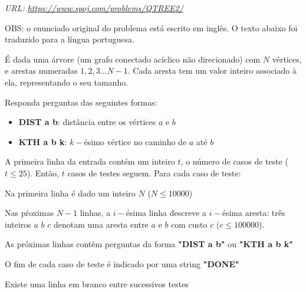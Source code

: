 {

\textit{URL: \url{https://www.spoj.com/problems/QTREE2/}}

\vspace{0.3cm}OBS: o enunciado original do problema está escrito em inglês. O texto abaixo foi traduzido para a língua portuguesa.\vspace{0.3cm}

\begin{mdframed}[backgroundcolor=blue!5]
\vspace{-0.5cm}

\vspace{0.2cm}

É dada uma árvore (um grafo conectado acíclico não direcionado) com $N$ vértices, e arestas numeradas $1, 2, 3...N-1$. Cada aresta tem um valor inteiro associado à ela, representando o seu tamanho.

Responda perguntas das seguintes formas:

\begin{itemize}
    \item \textbf{DIST a b}: distância entre os vértices $a$ e $b$
    \item \textbf{KTH a b k}: $k-$ésimo vértice no caminho de $a$ até $b$
\end{itemize}

\vspace{0.2cm}

A primeira linha da entrada contém um inteiro $t$, o número de casos de teste ($t \leq 25$). Então, $t$ casos de testes seguem. Para cada caso de teste: \vspace{0.1cm}

Na primeira linha é dado um inteiro $N$ ($N \leq 10000$)

Nas pŕoximas $N-1$ linhas, a $i-$ésima linha descreve a $i-$ésima aresta: três inteiros $a$ $b$ $c$ denotam uma aresta entre $a$ e $b$ com custo $c$ ($c \leq 100000$).

As próximas linhas contêm perguntas da forma \textbf{"DIST a b"} ou \textbf{"KTH a b k"}

O fim de cada caso de teste é indicado por uma string \textbf{"DONE"}

Existe uma linha em branco entre sucessivos testes

\vspace{0.2cm}


\end{mdframed}}

